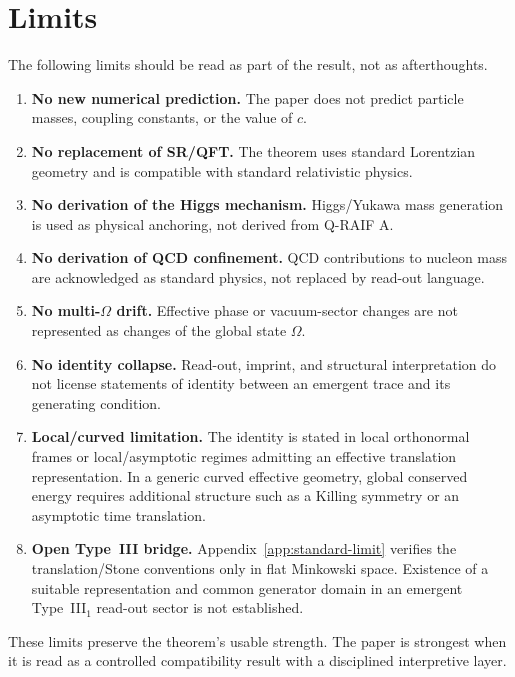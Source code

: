 \documentclass[12pt,a4paper]{article}
\theoremstyle{definition}
\theoremstyle{remark}
\newcommand{\Omegastate}{\Omega}
\begin{document}
\section{Limits}
\label{sec:limits}

The following limits should be read as part of the result, not as afterthoughts.

\begin{enumerate}[leftmargin=*]
\item \textbf{No new numerical prediction.} The paper does not predict particle masses, coupling constants, or the value of $c$.
\item \textbf{No replacement of SR/QFT.} The theorem uses standard Lorentzian geometry and is compatible with standard relativistic physics.
\item \textbf{No derivation of the Higgs mechanism.} Higgs/Yukawa mass generation is used as physical anchoring, not derived from Q-RAIF A.
\item \textbf{No derivation of QCD confinement.} QCD contributions to nucleon mass are acknowledged as standard physics, not replaced by read-out language.
\item \textbf{No multi-$\Omegastate$ drift.} Effective phase or vacuum-sector changes are not represented as changes of the global state $\Omegastate$.
\item \textbf{No identity collapse.} Read-out, imprint, and structural interpretation do not license statements of identity between an emergent trace and its generating condition.
\item \textbf{Local/curved limitation.} The identity is stated in local orthonormal frames or local/asymptotic regimes admitting an effective translation representation. In a generic curved effective geometry, global conserved energy requires additional structure such as a Killing symmetry or an asymptotic time translation.
\item \textbf{Open Type~III bridge.} Appendix~\ref{app:standard-limit} verifies the translation/Stone conventions only in flat Minkowski space.  Existence of a suitable representation and common generator domain in an emergent Type~III$_1$ read-out sector is not established.
\end{enumerate}

These limits preserve the theorem's usable strength. The paper is strongest when it is read as a controlled compatibility result with a disciplined interpretive layer.
\end{document}
